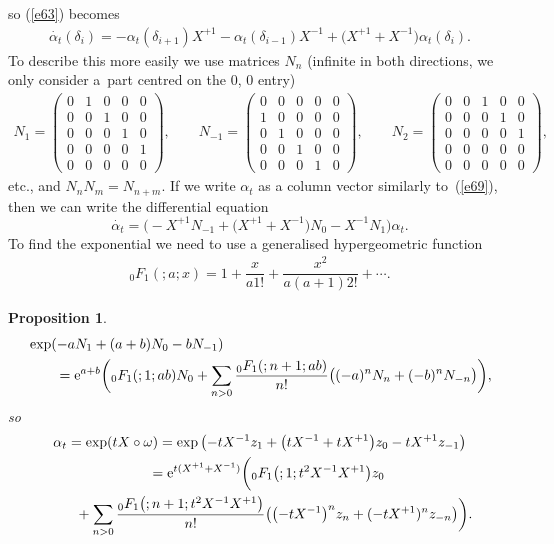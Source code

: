 \documentclass[pdftex]{sigma}
\numberwithin{equation}{section}
\newtheorem{Proposition}[Theorem]{Proposition}
 { \theoremstyle{definition}
\newtheorem{Definition}[Theorem]{Definition}
\newtheorem{Note}[Theorem]{Note}
\newtheorem{Example}[Theorem]{Example}
\newtheorem{Remark}[Theorem]{Remark} }
\newcommand{\<}{\langle}
\renewcommand{\>}{\rangle}
\begin{document}
so (\ref{e63}) becomes
\begin{gather}\label{e55}
\dot{\alpha_t}(\delta_{i})=-\alpha_t (\delta_{i+1}) X^{+1} -\alpha _t(\delta_{i-1}) X^{-1}+\big(X^{+1} +X^{-1} \big) \alpha_t (\delta_{i}).
\end{gather}
To describe this more easily we use matrices $ N_{n} $ (infinite in both directions, we only consider a~part centred on the $ 0$, $0 $ entry)
\begin{gather*}
	N_{1}=\left( \begin{matrix}
		0& 1& 0 & 0 & 0 \\
		0& 0 & 1& 0 & 0 \\
	0	& 0 & 0 &1 & 0 \\
		0& 0 & 0&0 &1 \\
		0& 0& 0& 0 & 0
	\end{matrix}
	\right), \qquad N_{-1}=\left( \begin{matrix}
		0& 0 &0 & 0& 0 \\
		1& 0 & 0 & 0 & 0\\
		0& 1 & 0 & 0& 0\\
		0& 0 & 1&0 & 0 \\
		0& 0& 0&1 & 0
	\end{matrix}
	\right), \qquad N_{2}=\left( \begin{matrix}
		0& 0 & 1& 0 & 0 \\
		0& 0 & 0 & 1& 0 \\
		0& 0& 0 & 0 & 1 \\
		0& 0& 0 &0 & 0 \\
	0	& 0& 0&0 & 0
	\end{matrix}
	\right),
\end{gather*}
etc., and $ N_{n}N_{m}=N_{n+m} $. If we write $ \alpha_t $ as a column vector similarly to~(\ref{e69}), then we can write the differential equation
\[\dot{\alpha_t}= \big({-}X^{+1} N_{-1}+\big(X^{+1}+X^{-1}\big) N_{0}-X^{-1}N_{1}\big)\alpha_t.\]
 To find the exponential we need to use a generalised hypergeometric function~\cite{web}
	\begin{gather*}
{}_{0}F_{1}(;a ;x)=1+\dfrac{x}{a 1!}+\dfrac{x^{2}}{a (a+1) 2!}+\cdots.
\end{gather*}
\begin{Proposition}\label{P2}
	\begin{gather*}
\begin{split}
&	\exp(-aN_{1}+(a+b)N_{0}-bN_{-1})\\
&\qquad{} ={\rm e}^{a+b}\bigg({}_{0}F_{1}(;1;ab)N_{0}+\sum_{n > 0}\dfrac{{}_{0}F_{1} (;n+1;ab)}{n!}\big((-a)^{n}N_{n}+(-b)^{n}N_{-n}\big)\bigg),
\end{split}
	\end{gather*}
so
	\begin{gather*}
\alpha _{t} =\exp (tX \circ \omega)	=\exp\big({-}t X^{-1}z_{1}+\big(t X^{-1}+t X^{+1}\big)z_{0}-t X^{+1}z_{-1}\big)\cr
\hphantom{\alpha _{t}}{}
={\rm e}^{t(X^{+1}+X^{-1})}\bigg({}_{0}F_{1}\big(;1;t^{2} X^{-1}X^{+1}\big)z_{0}\\
\hphantom{\alpha _{t} =}{}
+\sum_{n > 0}\dfrac{{}_{0}F_{1} \big(;n+1;t^{2} X^{-1}X^{+1}\big)}{n!}\big(\big({-}t X^{-1}\big)^{n}z_{n}+(-t X^{+1})^{n}z_{-n}\big)\bigg).
\end{gather*}
\end{Proposition}
\end{document}
